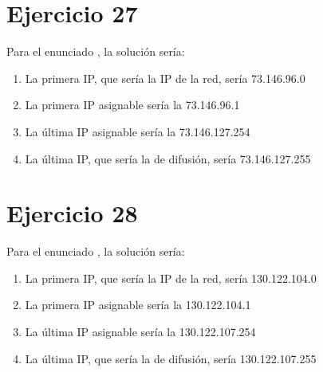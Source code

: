 \documentclass[letterpaper,10pt,spanish]{sphinxmanual}
\begin{document}
\section{Ejercicio 27}
\label{\detokenize{t2_integracion_elementos/ejercicios_subredes_ipv4/rangos_direcciones:id27}}
\sphinxAtStartPar
Para el enunciado , la solución sería:
\begin{enumerate}
%
\item {} 
\sphinxAtStartPar
La primera IP, que sería la IP de la red, sería 73.146.96.0

\item {} 
\sphinxAtStartPar
La primera IP asignable sería la 73.146.96.1

\item {} 
\sphinxAtStartPar
La última IP asignable sería la 73.146.127.254

\item {} 
\sphinxAtStartPar
La última IP, que sería la de difusión, sería 73.146.127.255

\end{enumerate}


\section{Ejercicio 28}
\label{\detokenize{t2_integracion_elementos/ejercicios_subredes_ipv4/rangos_direcciones:id28}}
\sphinxAtStartPar
Para el enunciado , la solución sería:
\begin{enumerate}
%
\item {} 
\sphinxAtStartPar
La primera IP, que sería la IP de la red, sería 130.122.104.0

\item {} 
\sphinxAtStartPar
La primera IP asignable sería la 130.122.104.1

\item {} 
\sphinxAtStartPar
La última IP asignable sería la 130.122.107.254

\item {} 
\sphinxAtStartPar
La última IP, que sería la de difusión, sería 130.122.107.255

\end{enumerate}
\end{document}
